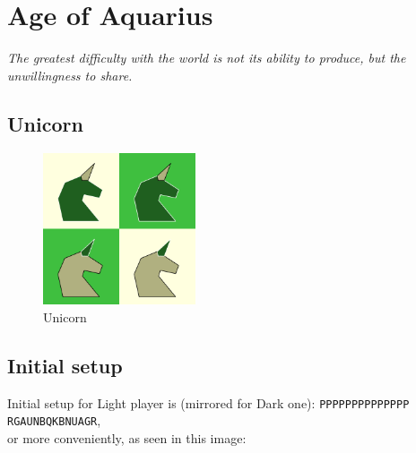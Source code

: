 \documentclass[a5paper,12pt,draft]{book} %
\begin{document}
\clearpage

\chapter*{Age of Aquarius}

\begin{flushright}
\parbox{0.8\textwidth}{
\emph{The greatest difficulty with the world is not its ability to produce, but the unwillingness to share. \\
 } }
\end{flushright}

\section*{Unicorn}

\noindent
\begin{figure}
\includegraphics[width=0.4\textwidth, keepaspectratio=true]{../gfx/pieces/09_unicorn.png}
\caption{Unicorn}
\label{fig:unicorn}
\end{figure}

\clearpage

\section*{Initial setup}

Initial setup for Light player is (mirrored for Dark one):
\texttt{PPPPPPPPPPPPPP \\
        RGAUNBQKBNUAGR}, \\
or more conveniently, as seen in this image:
\end{document}
